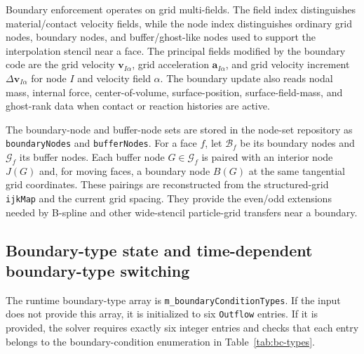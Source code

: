 Boundary enforcement operates on grid multi-fields.  The field index distinguishes material/contact velocity fields, while the node index distinguishes ordinary grid nodes, boundary nodes, and buffer/ghost-like nodes used to support the interpolation stencil near a face.  The principal fields modified by the boundary code are the grid velocity $\mathbf{v}_{I\alpha}$, grid acceleration $\mathbf{a}_{I\alpha}$, and grid velocity increment $\Delta\mathbf{v}_{I\alpha}$ for node $I$ and velocity field $\alpha$.  The boundary update also reads nodal mass, internal force, center-of-volume, surface-position, surface-field-mass, and ghost-rank data when contact or reaction histories are active.

The boundary-node and buffer-node sets are stored in the node-set repository as \texttt{boundaryNodes} and \texttt{bufferNodes}.  For a face $f$, let $\mathcal{B}_f$ be its boundary nodes and $\mathcal{G}_f$ its buffer nodes.  Each buffer node $G\in\mathcal{G}_f$ is paired with an interior node $J(G)$ and, for moving faces, a boundary node $B(G)$ at the same tangential grid coordinates.  These pairings are reconstructed from the structured-grid \texttt{ijkMap} and the current grid spacing.  They provide the even/odd extensions needed by B-spline and other wide-stencil particle-grid transfers near a boundary.

\subsection{Boundary-type state and time-dependent boundary-type switching}
\label{subsec:bc-table-internals}

The runtime boundary-type array is \texttt{m\_boundaryConditionTypes}.  If the input does not provide this array, it is initialized to six \texttt{Outflow} entries.  If it is provided, the solver requires exactly six integer entries and checks that each entry belongs to the boundary-condition enumeration in Table~\ref{tab:bc-types}.

